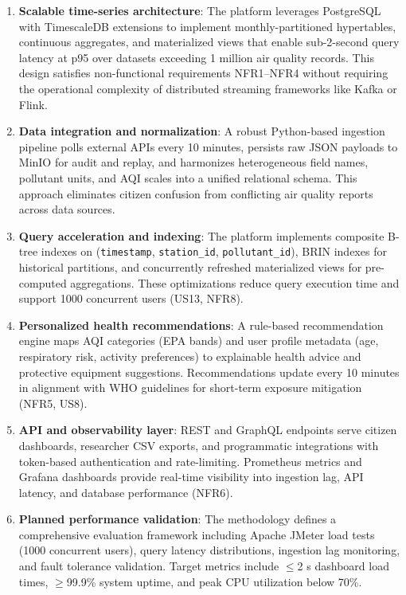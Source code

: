 \begin{enumerate}
    \item \textbf{Scalable time-series architecture}: The platform leverages PostgreSQL with TimescaleDB extensions to implement monthly-partitioned hypertables, continuous aggregates, and materialized views that enable sub-2-second query latency at p95 over datasets exceeding 1 million air quality records. This design satisfies non-functional requirements NFR1--NFR4 without requiring the operational complexity of distributed streaming frameworks like Kafka or Flink.
    
    \item \textbf{Data integration and normalization}: A robust Python-based ingestion pipeline polls external APIs every 10 minutes, persists raw JSON payloads to MinIO for audit and replay, and harmonizes heterogeneous field names, pollutant units, and AQI scales into a unified relational schema. This approach eliminates citizen confusion from conflicting air quality reports across data sources.
    
    \item \textbf{Query acceleration and indexing}: The platform implements composite B-tree indexes on (\texttt{timestamp}, \texttt{station\_id}, \texttt{pollutant\_id}), BRIN indexes for historical partitions, and concurrently refreshed materialized views for pre-computed aggregations. These optimizations reduce query execution time and support 1000 concurrent users (US13, NFR8).
    
    \item \textbf{Personalized health recommendations}: A rule-based recommendation engine maps AQI categories (EPA bands) and user profile metadata (age, respiratory risk, activity preferences) to explainable health advice and protective equipment suggestions. Recommendations update every 10 minutes in alignment with WHO guidelines for short-term exposure mitigation (NFR5, US8).
    
    \item \textbf{API and observability layer}: REST and GraphQL endpoints serve citizen dashboards, researcher CSV exports, and programmatic integrations with token-based authentication and rate-limiting. Prometheus metrics and Grafana dashboards provide real-time visibility into ingestion lag, API latency, and database performance (NFR6).
    
    \item \textbf{Planned performance validation}: The methodology defines a comprehensive evaluation framework including Apache JMeter load tests (1000 concurrent users), query latency distributions, ingestion lag monitoring, and fault tolerance validation. Target metrics include $\leq$2 s dashboard load times, $\geq$99.9\% system uptime, and peak CPU utilization below 70\%.
\end{enumerate}

